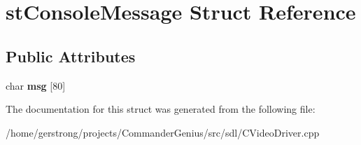 \hypertarget{structst_console_message}{
\section{stConsoleMessage Struct Reference}
\label{structst_console_message}
}
\subsection*{Public Attributes}
\begin{DoxyCompactItemize}
\item 
\hypertarget{structst_console_message_ae681f5945c4c0ac30830c5a5cec07745}{
char {\bfseries msg} \mbox{[}80\mbox{]}}
\label{structst_console_message_ae681f5945c4c0ac30830c5a5cec07745}

\end{DoxyCompactItemize}


The documentation for this struct was generated from the following file:\begin{DoxyCompactItemize}
\item 
/home/gerstrong/projects/CommanderGenius/src/sdl/CVideoDriver.cpp\end{DoxyCompactItemize}
